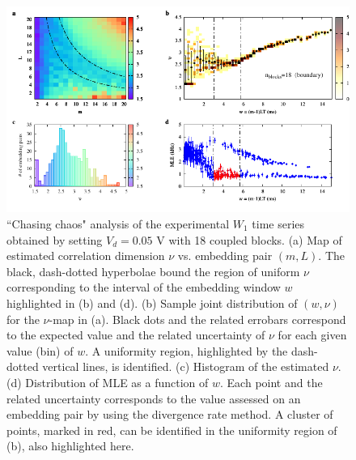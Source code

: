\begin{figure}[H]
    \centering
    \includegraphics[width=\linewidth]{../blocks/18_blocks/2e5_points/plots/chaos_low.pdf}
    \caption{``Chasing chaos" analysis of the experimental $W_1$ time series obtained by setting $V_d=0.05$ V with 18 coupled blocks.
    (a) Map of estimated correlation dimension $\nu$ vs. embedding pair $(m, L)$.
    The black, dash-dotted hyperbolae bound the region of uniform $\nu$ corresponding to the interval of the
    embedding window $w$ highlighted in (b) and (d).
    (b) Sample joint distribution of $(w,\nu)$ for the $\nu$-map in (a).
    Black dots and the related errobars correspond to the expected value and the related uncertainty of $\nu$
    for each given value (bin) of $w$. A uniformity region, highlighted by the dash-dotted vertical lines,
    is identified. (c) Histogram of the estimated $\nu$. (d) Distribution of MLE as a function of $w$. Each point and the related
    uncertainty corresponds to the value assessed on an embedding pair by using the divergence rate method.
    A cluster of points, marked in red, can be identified in the uniformity region of (b), also highlighted here.}
    \label{fig:18 blocks chaos}
\end{figure}


